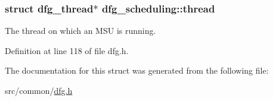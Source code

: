 \hypertarget{structdfg__scheduling_af63999d85b15782bbfc667be6b227fa7}{
\subsubsection[{thread}]{\setlength{\rightskip}{0pt plus 5cm}struct {\bf dfg\-\_\-thread}$\ast$ dfg\-\_\-scheduling\-::thread}}\label{structdfg__scheduling_af63999d85b15782bbfc667be6b227fa7}


The thread on which an M\-S\-U is running. 



Definition at line 118 of file dfg.\-h.



The documentation for this struct was generated from the following file\-:\begin{DoxyCompactItemize}
\item 
src/common/\hyperlink{dfg_8h}{dfg.\-h}\end{DoxyCompactItemize}
